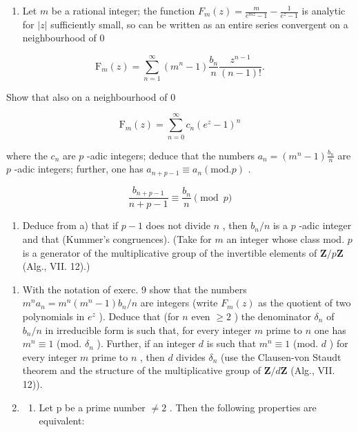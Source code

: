 \begin{enumerate}
\def\labelenumi{\alph{enumi})}
\tightlist
\item
  Let \(m\) be a rational integer; the function \(F_{m}(z) = \frac{m}{e^{mz} - 1} - \frac{1}{e^{z} - 1}\) is analytic for \(|z|\) sufficiently small, so can be written as an entire series convergent on a neighbourhood of 0
\end{enumerate}

\[
\mathrm{F} _ {m} (z) = \sum_ {n = 1} ^ {\infty} (m ^ {n} - 1) \frac {b _ {n}}{n} \frac {z ^ {n - 1}}{(n - 1) !}.
\]

Show that also on a neighbourhood of 0

\[
\mathrm{F} _ {m} (z) = \sum_ {n = 0} ^ {\infty} c _ {n} (e ^ {z} - 1) ^ {n}
\]

where the \(c_{n}\) are \(p\) -adic integers; deduce that the numbers \(a_{n} = (m^{n} - 1)\frac{b_{n}}{n}\) are \(p\) -adic integers; further, one has \(a_{n + p - 1} \equiv a_{n} (\mathrm{mod.} p)\) .

\[
\frac {b _ {n + p - 1}}{n + p - 1} \equiv \frac {b _ {n}}{n} \pmod {p}
\]

\begin{enumerate}
\def\labelenumi{\alph{enumi})}
\setcounter{enumi}{1}
\tightlist
\item
  Deduce from a) that if \(p - 1\) does not divide \(n\) , then \(b_{n} / n\) is a \(p\) -adic integer and that (Kummer's congruences). (Take for \(m\) an integer whose class mod. \(p\) is a generator of the multiplicative group of the invertible elements of \(\mathbf{Z} / p\mathbf{Z}\) (Alg., VII. 12).)
\end{enumerate}

\begin{enumerate}
\def\labelenumi{\arabic{enumi})}
\setcounter{enumi}{9}
\item
  With the notation of exerc. 9 show that the numbers \(m^n a_n = m^n (m^n - 1)b_n / n\) are integers (write \(F_m(z)\) as the quotient of two polynomials in \(e^z\) ). Deduce that (for \(n\) even \(\geqslant 2\) ) the denominator \(\delta_n\) of \(b_n / n\) in irreducible form is such that, for every integer \(m\) prime to \(n\) one has \(m^n \equiv 1\) (mod. \(\delta_n\) ). Further, if an integer \(d\) is such that \(m^n \equiv 1\) (mod. \(d\) ) for every integer \(m\) prime to \(n\) , then \(d\) divides \(\delta_n\) (use the Clausen-von Staudt theorem and the structure of the multiplicative group of \(\mathbf{Z} / d\mathbf{Z}\) (Alg., VII. 12)).
\item
  \begin{enumerate}
  \def\labelenumii{\alph{enumii})}
  \tightlist
  \item
    Let p be a prime number \(\neq 2\) . Then the following properties are equivalent:
  \end{enumerate}
\end{enumerate}

